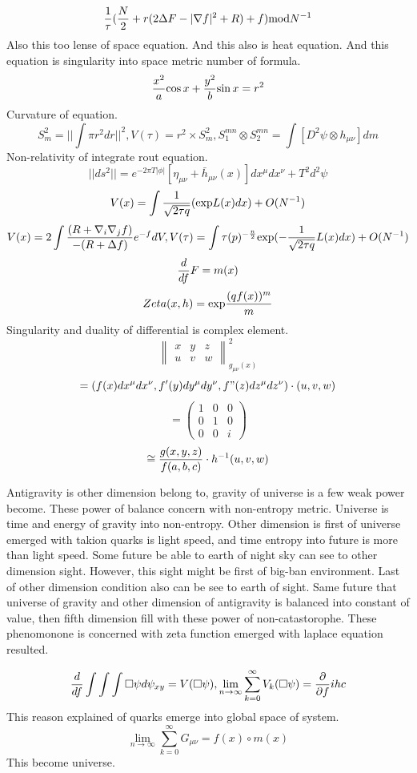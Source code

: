 \documentclass{jsarticle}
\begin{document}
  $$ {1 \over \tau}({N \over 2} + r(2 \Delta F - |\nabla f|^2 + R) + f)\mathrm{mod}N^{-1} $$
  Also this too lense of space equation. And this also is  heat equation.
  And this equation is singularity into space metric number of formula.
  $$ {x^2 \over a}{\cos x} + {y^2 \over b}{\sin x} = r^2 $$
  Curvature of equation.
  $$ S^2_m = ||\int \pi r^2 dr||^2, V(\tau) = r^2 \times S^2_m, S^{mn}_1 \otimes S^{mn}_2 = \int [D^2 \psi \otimes
  h_{\mu\nu}]dm $$
  Non-relativity of integrate rout equation.
  $$ ||ds^2|| = e^{-2\pi T|\phi|}[\eta_{\mu\nu} + \bar{h}_{\mu\nu}(x)]dx^{\mu}dx^{\nu} + T^2 d^2 \psi $$
  $$ V(x) = \int {1 \over \sqrt{2 \tau q}}(\mathrm{exp}L(x)dx) + O(N^{-1}) $$
  $$ V(x) = 2 \int{(R + \nabla_{i}\nabla_{j}f) \over {- (R + \Delta f)}}e^{-f}dV,
  V(\tau) = \int \tau(p)^{-{n \over 2}}\mathrm{exp}
	  (-{1 \over \sqrt{2 \tau q}}L(x)dx) + O(N^{-1}) $$ 
	  $$ {d \over df}F = m(x) $$
	  $$ Zeta(x,h) = \mathrm{exp}{(qf(x))^m \over m} $$
	  Singularity and duality of differential is complex element.
	  $$ \begin{Vmatrix} x & y & z \\
  u & v & w \end{Vmatrix}^2_{g_{\mu\nu}(x)} $$
	  $$ = (f(x)dx^{\mu}dx^{\nu}, f'(y)dy^{\mu}dy^{\nu}, f"(z)dz^{\mu}dz^{\nu}) \cdot (u,v,w) $$
	  $$  = \begin{pmatrix} 1 & 0 & 0 \\
	  0 & 1 & 0 \\
  0 & 0 & i \end{pmatrix} $$
	  $$ \cong {g(x,y,z) \over f(a,b,c)}\cdot h^{-1}(u,v,w) $$

  Antigravity is other dimension belong to, gravity of universe is a few weak power become.
These power of balance concern with non-entropy metric.
Universe is time and energy of gravity into non-entropy. Other dimension is first of universe emerged with
takion quarks is light speed, and time entropy into future is more than light speed.
Some future be able to earth of night sky can see to other dimension sight.
However, this sight might be first of big-ban environment. Last of other dimension condition also can be see to earth
of sight.
 Same future that universe of gravity and other dimension of antigravity is balanced into constant of value,
then fifth dimension fill with these power of non-catastorophe.
These phenomonone is concerned with zeta function emerged with laplace equation resulted.

$$ {d \over df}\int \int \int \square \psi d \psi_{xy} = V(\square \psi), \lim_{n \to \infty}\sum_{k=0}^{\infty}
V_k(\square \psi) = {\partial \over \partial f}i h c  $$
This reason explained of quarks emerge into global space of system.
$$\lim_{n \to \infty}\sum_{k=0}^{\infty}G_{\mu\nu} = f(x) \circ m(x) $$
This become universe.
\end{document}
